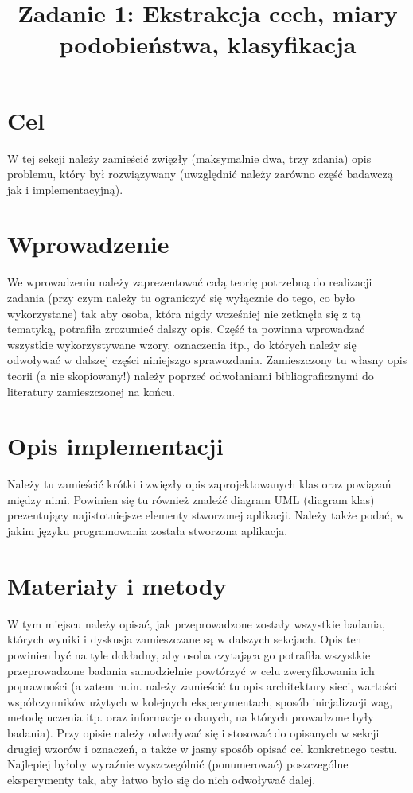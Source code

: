 \documentclass{classrep}
\author{
	\studentinfo{Justyna Hubert}{210200} \and
	\studentinfo{Karol Podlewski}{210294}
}
\title{Zadanie 1: Ekstrakcja cech, miary podobieństwa, klasyfikacja}
\begin{document}
	\maketitle
	
	
	\section{Cel}
	{\color{blue} 
		W tej sekcji należy zamieścić zwięzły (maksymalnie dwa, trzy zdania) opis
		problemu, który był rozwiązywany (uwzględnić należy zarówno część badawczą jak
		i implementacyjną).}
	
	\section{Wprowadzenie}
	{\color{blue}
		We wprowadzeniu należy zaprezentować całą teorię potrzebną do realizacji
		zadania (przy czym należy tu ograniczyć się wyłącznie do tego, co było
		wykorzystane) tak aby osoba, która nigdy wcześniej nie zetknęła się z tą
		tematyką, potrafiła zrozumieć dalszy opis. Część ta powinna wprowadzać
		wszystkie wykorzystywane wzory, oznaczenia itp., do których należy się
		odwoływać w dalszej części niniejszgo sprawozdania. Zamieszczony tu własny
		opis teorii (a nie skopiowany!) należy poprzeć odwołaniami bibliograficznymi
		do literatury zamieszczonej na końcu. }
	
	\section{Opis implementacji}
	{\color{blue}
		Należy tu zamieścić krótki i zwięzły opis zaprojektowanych klas oraz powiązań
		między nimi. Powinien się tu również znaleźć diagram UML  (diagram klas)
		prezentujący najistotniejsze elementy stworzonej aplikacji. Należy także
		podać, w jakim języku programowania została stworzona aplikacja. }
	
	\section{Materiały i metody}
	{\color{blue}
		W tym miejscu należy opisać, jak przeprowadzone zostały wszystkie badania,
		których wyniki i dyskusja zamieszczane są w dalszych sekcjach. Opis ten
		powinien być na tyle dokładny, aby osoba czytająca go potrafiła wszystkie
		przeprowadzone badania samodzielnie powtórzyć w celu zweryfikowania ich
		poprawności (a zatem m.in. należy zamieścić tu opis architektury sieci,
		wartości współczynników użytych w kolejnych eksperymentach, sposób
		inicjalizacji wag, metodę uczenia itp. oraz informacje o danych, na których
		prowadzone były badania). Przy opisie należy odwoływać się i stosować do
		opisanych w sekcji drugiej wzorów i oznaczeń, a także w jasny sposób opisać
		cel konkretnego testu. Najlepiej byłoby wyraźnie wyszczególnić (ponumerować)
		poszczególne eksperymenty tak, aby łatwo było się do nich odwoływać dalej.}
	
\end{document}
